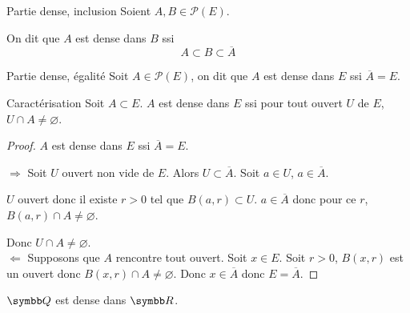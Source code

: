 \begin{definition}{Partie dense, inclusion}{}
    Soient $A, B \in \mathscr P(E)$.

    On dit que $A$ est dense dans $B$ ssi 
    \[A \subset B \subset \overline A\]
\end{definition}

\begin{definition}{Partie dense, égalité}{}
    Soit $A \in \mathscr P(E)$, on dit que $A$ est dense dans $E$ ssi $\overline A = E$.
\end{definition}

\begin{proposition}{Caractérisation}{}
    Soit $A \subset E$. $A$ est  dense dans $E$ ssi pour tout ouvert $U$ de $E$, $U \cap A \neq \varnothing$.     
\end{proposition}

\begin{proof}
$A$ est dense dans $E$ ssi $\overline A = E$.

$\Rightarrow$ Soit $U$ ouvert non vide de $E$.
Alors $U \subset \overline A$.
Soit $a \in U$, $a \in \overline A$.

$U$ ouvert donc il existe $r > 0$ tel que $B(a,r) \subset U$.
$a \in \overline A$ donc pour ce $r$, $B(a,r) \cap A \neq \varnothing$.

Donc $U \cap A \neq \varnothing$. \\

$\Leftarrow$ Supposons que $A$ rencontre tout ouvert.
Soit $x \in E$. Soit $r > 0$, $B(x,r)$ est un ouvert donc $B(x,r) \cap A \neq \varnothing$.
Donc $x \in \overline A$ donc $E = \overline A$.
\end{proof}

\begin{exemple}
    $\Q$ est dense dans $\R$.
\end{exemple}

